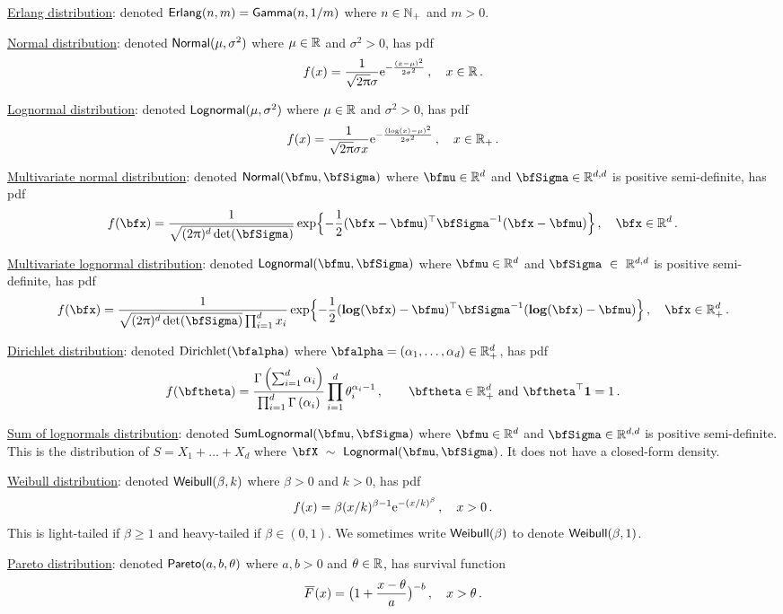 \underline{Erlang distribution}: denoted $\mathsf{Erlang}(n, m) = \mathsf{Gamma}(n, 1/m)$ where $n \in \mathbb{N}_+$ and $m > 0$.

\underline{Normal distribution}: denoted $\mathsf{Normal}(\mu, \sigma^2)$ where $\mu \in \mathbb{R}$ and $\sigma^2 > 0$, has pdf
\[ f(x) = \frac{1}{\sqrt{2 \uppi} \sigma} \mathrm{e}^{-\frac{(x-\mu)^2}{2 \sigma^2}} \,, \quad x \in \mathbb{R} \,. \]

\underline{Lognormal distribution}: denoted $\mathsf{Lognormal}(\mu, \sigma^2)$ where $\mu \in \mathbb{R}$ and $\sigma^2 > 0$, has pdf
\[ f(x) = \frac{1}{\sqrt{2 \uppi} \sigma x} \mathrm{e}^{-\frac{(\log(x)-\mu)^2}{2 \sigma^2}} \,, \quad x \in \mathbb{R}_+ \,.  \]

\underline{Multivariate normal distribution}: denoted $\NormDist(\bfmu, \bfSigma)$ where $\bfmu \in \RL^d$ and $\bfSigma \in \RL^{d,d}$ is positive semi-definite, has pdf
\[
  f(\bfx) = \frac{1}{\sqrt{(2\pi)^d \det(\bfSigma)}} \exp\Bigl\{ {-}\frac12 (\bfx - \bfmu)^\tr \bfSigma^{-1} (\bfx - \bfmu) \Bigr\} \,, \quad \bfx \in \RL^d \,.
\]

\underline{Multivariate lognormal distribution}: denoted $\LNDist(\bfmu, \bfSigma)$ where $\bfmu \in \RL^d$ and $\bfSigma~\in~\RL^{d,d}$ is positive semi-definite, has pdf
\[ f(\bfx) = \frac{1}{\sqrt{(2\pi)^d \det(\bfSigma)} \prod_{i=1}^d x_i} \exp\Bigl\{ {-}\frac12 ( \vlog(\bfx) - \bfmu )^\tr \bfSigma^{-1} (\vlog(\bfx) - \bfmu) \Bigr\} \,, \quad \bfx \in \RL_+^d \,. \]

\underline{Dirichlet distribution}: denoted $\mathrm{Dirichlet}(\bfalpha)$ where $\bfalpha=(\alpha_1,\dots,\alpha_d) \in \RL_+^d$, has pdf
\[
f(\bftheta) = \frac{\Gamma\left(\sum_{i=1}^d \alpha_i\right)}{\prod_{i=1}^d \Gamma\left(\alpha_i \right)} \prod_{i=1}^d \theta_i^{\alpha_i-1} \,,\qquad \bftheta \in \mathbb{R}_+^d \text{ and } \bftheta^\top\bfone = 1  \,.
\]

\underline{Sum of lognormals distribution}: denoted $\SLNDist(\bfmu, \bfSigma)$ where $\bfmu \in \RL^d$ and $\bfSigma \in \RL^{d,d}$ is positive semi-definite. This is the distribution of $S = X_1 + \dots + X_d$ where $\bfX~\sim~\LNDist(\bfmu, \bfSigma)$. It does not have a closed-form density.

\underline{Weibull distribution}: denoted $\mathsf{Weibull}(\beta, k)$ where $\beta > 0$ and $k > 0$, has pdf
\[ f(x) = \beta (x/k)^{\beta-1} \mathrm{e}^{-(x/k)^\beta} \,, \quad x > 0 \,. \]
This is light-tailed if $\beta \ge 1$ and heavy-tailed if $\beta \in (0, 1)$. We sometimes write $\mathsf{Weibull}(\beta)$ to denote $\mathsf{Weibull}(\beta, 1)$.

\underline{Pareto distribution}: denoted $\mathsf{Pareto}(a, b, \theta)$ where $a,b>0$ and $\theta \in \mathbb{R}$, has survival function
\[ \Ftail(x) = \bigl( 1 + \frac{x-\theta}{a} \bigr)^{-b} \,, \quad x > \theta \,. \]

